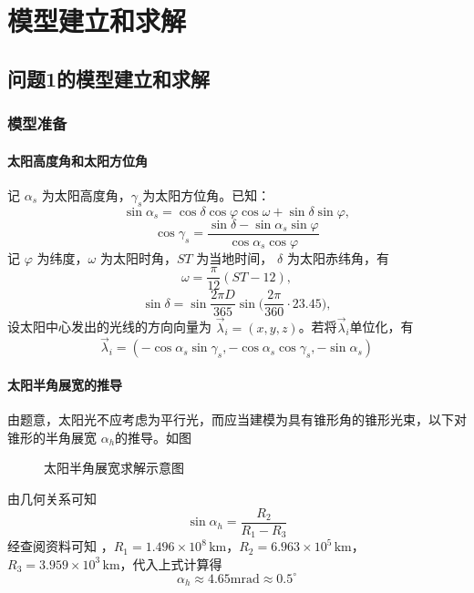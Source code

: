 \documentclass[../main.tex]{subfiles}
\begin{document}
\section{模型建立和求解}
\subsection{问题1的模型建立和求解}
\subsubsection{模型准备}
\paragraph{太阳高度角和太阳方位角}
记 \(\alpha _{s}\) 为太阳高度角，\(\gamma _{s}\)为太阳方位角。已知：
\begin{equation}
\sin \alpha _{s} = \cos \delta \cos \varphi \cos \omega + \sin \delta \sin \varphi\label{equ:alpha},
\end{equation}
\begin{equation}
\cos \gamma _{s} = \frac{\sin \delta -\sin \alpha_{s} \sin \varphi}{\cos \alpha _{s} \cos \varphi}\label{equ:gamma}
\end{equation}
记 \( \varphi\) 为纬度，\(\omega\) 为太阳时角，\(ST\) 为当地时间， \(\delta\) 为太阳赤纬角，有
\begin{equation}
\omega = \frac{\pi}{12} ( ST - 12),
\end{equation}
\begin{equation}
\sin \delta = \sin \frac{2 \pi D}{365} \sin \big(\frac{2\pi}{360} \cdot 23.45\big),
\end{equation}
设太阳中心发出的光线的方向向量为 \(\vec\lambda _{i} = (x,  y , z)\)。若将\(\vec \lambda_{i}\)单位化，有
\begin{equation}
\vec \lambda _{i} = ({-} \cos \alpha _{s} \sin \gamma_{s} ,{-} \cos \alpha_{s} \cos \gamma_{s}, {-} \sin \alpha_{s})
\end{equation}
\paragraph{太阳半角展宽的推导}
由题意，太阳光不应考虑为平行光，而应当建模为具有锥形角的锥形光束，以下对锥形的半角展宽 \( \alpha_{h}\)的推导。如图
%
\begin{figure}[H]
\centering

\caption{\kaishu 太阳半角展宽求解示意图}
\end{figure}
%
由几何关系可知
\begin{equation}
\sin \alpha_{h} = \frac{R_{2}}{R_1 - R_3}
\end{equation}
经查阅资料\cite{abook}可知
，\(R_1 = 1.496\times 10 ^{8} \, \mathrm{km}\)，\(R_2 = 6.963\times 10 ^{5}\,\mathrm{km}\)，\(R_3 = 3.959\times 10^{3}\, \mathrm{km}\)，代入上式计算得
\begin{equation}
\alpha_{h} \approx 4.65 \mathrm{mrad} \approx 0.5 ^{\circ}
\end{equation}
\end{document}
